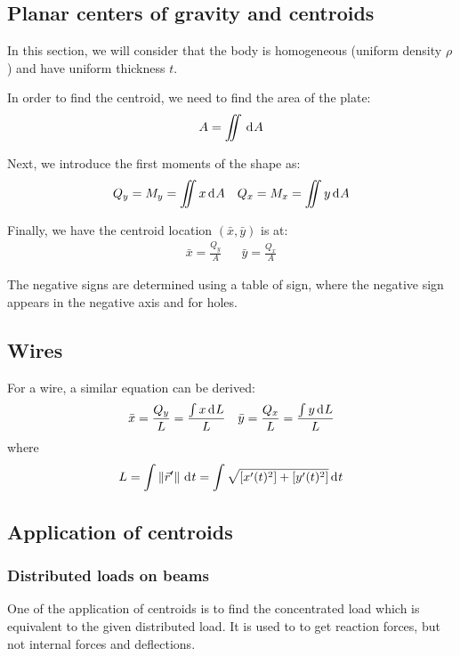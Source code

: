 \documentclass[10pt, twocolumn]{article}
\begin{document}
\subsection{Planar centers of gravity and centroids}
In this section, we will consider that the body is homogeneous (uniform density \(\rho\)) and have uniform thickness \(t\).

In order to find the centroid, we need to find the area of the plate:
\[
  A = \iint{\,\mathrm{d}^{} A} \\
\]

Next, we introduce the first moments of the shape as:
\begin{align*}
  Q_y = M_y = \iint{x \,\mathrm{d}^{} A} &  & Q_x = M_x = \iint{y \,\mathrm{d}^{} A}
\end{align*}

Finally, we have the centroid location \((\bar{x}, \bar{y})\) is at:
\begin{align*}
  \bar{x} = \frac{Q_y}{A} &  & \bar{y} = \frac{Q_x}{A}
\end{align*}

The negative signs are determined using a table of sign, where the negative sign appears in the negative axis and for holes.

\subsection{Wires}
For a wire, a similar equation can be derived:
\begin{align*}
  \bar{x} = \frac{Q_y}{L} = \frac{\int{x \,\mathrm{d}^{} L}}{L} &  & \bar{y} = \frac{Q_x}{L} = \frac{\int{y \,\mathrm{d}^{} L}}{L}
\end{align*}
where
\[
  L = \int{\left\| \vec{r}' \right\| \,\mathrm{d}^{} t} = \int{\sqrt{\left[ x'(t)^2 \right] + \left[ y'(t)^2 \right]} \,\mathrm{d}^{} t}
\]

\subsection{Application of centroids}
\subsubsection{Distributed loads on beams}
One of the application of centroids is to find the concentrated load which is equivalent to the given distributed load.
It is used to to get reaction forces, but not internal forces and deflections.
\end{document}

